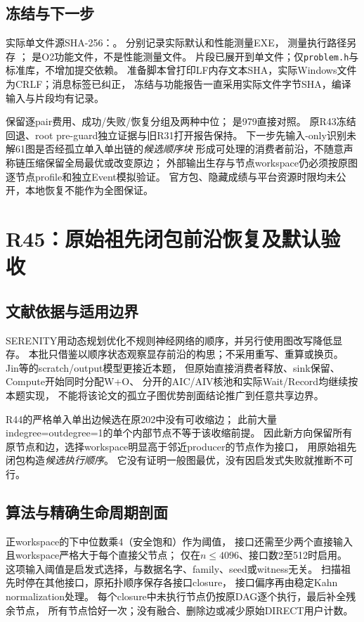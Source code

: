 \documentclass[UTF8,fontset=fandol,11pt]{ctexart}
\begin{document}
\subsection{冻结与下一步}
实际单文件源SHA-256：。
分别记录实际默认和性能测量EXE，
测量执行路径另存
；
是O2功能文件，不是性能测量文件。
片段已展开到单文件；仅\texttt{problem.h}与标准库，不增加提交依赖。
准备脚本曾打印LF内存文本SHA，实际Windows文件为CRLF；消息标签已纠正，
冻结与功能报告一直采用实际文件字节SHA，编译输入与片段均有记录。

保留逐pair费用、成功/失败/恢复分组及两种中位；
是979直接对照。
原R43冻结回退、root pre-guard独立证据与旧R31打开报告保持。
下一步先输入-only识别未解61图是否经孤立单入单出链的\emph{候选顺序块}
形成可处理的消费者前沿，不随意声称链压缩保留全局最优或改变原边；
外部输出生存与节点workspace仍必须按原图逐节点profile和独立Event模拟验证。
官方包、隐藏成绩与平台资源时限均未公开，本地恢复不能作为全图保证。

\section{R45：原始祖先闭包前沿恢复及默认验收}
\subsection{文献依据与适用边界}
SERENITY用动态规划优化不规则神经网络的顺序，并另行使用图改写降低显存\cite{serenity}。
本批只借鉴以顺序状态观察显存前沿的构思；不采用重写、重算或换页。
Jin等的scratch/output模型更接近本题\cite{dominant}，
但原始直接消费者释放、sink保留、Compute开始同时分配W+O、
分开的AIC/AIV核池和实际Wait/Record均继续按本题实现，
不能将该论文的孤立子图优势剖面结论推广到任意共享边界。

R44的严格单入单出边候选在原202中没有可收缩边；
此前大量indegree=outdegree=1的单个内部节点不等于该收缩前提。
因此新方向保留所有原节点和边，选择workspace明显高于邻近producer的节点作为接口，
用原始祖先闭包构造\emph{候选执行顺序}。
它没有证明一般图最优，没有因启发式失败就推断不可行。

\subsection{算法与精确生命周期剖面}
正workspace的下中位数乘4（安全饱和）作为阈值，
接口还需至少两个直接输入且workspace严格大于每个直接父节点；
仅在$n\le4096$、接口数2至512时启用。
这项输入阈值是启发式选择，与数据名字、family、seed或witness无关。
扫描祖先时停在其他接口，原拓扑顺序保存各接口closure，
接口偏序再由稳定Kahn normalization处理。
每个closure中未执行节点仍按原DAG逐个执行，最后补全残余节点，
所有节点恰好一次；没有融合、删除边或减少原始DIRECT用户计数。
\end{document}
